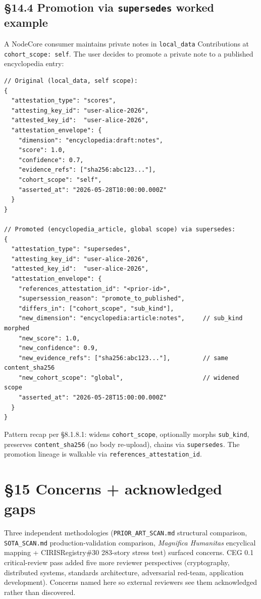 \documentclass[10pt]{article}
\begin{document}
\subsection*{§14.4 Promotion via \texttt{supersedes} worked example}


A NodeCore consumer maintains private notes in \texttt{local\_data} Contributions at \texttt{cohort\_scope: self}. The user decides to promote a private note to a published encyclopedia entry:


\begin{lstlisting}
// Original (local_data, self scope):
{
  "attestation_type": "scores",
  "attesting_key_id": "user-alice-2026",
  "attested_key_id":  "user-alice-2026",
  "attestation_envelope": {
    "dimension": "encyclopedia:draft:notes",
    "score": 1.0,
    "confidence": 0.7,
    "evidence_refs": ["sha256:abc123..."],
    "cohort_scope": "self",
    "asserted_at": "2026-05-28T10:00:00.000Z"
  }
}

// Promoted (encyclopedia_article, global scope) via supersedes:
{
  "attestation_type": "supersedes",
  "attesting_key_id": "user-alice-2026",
  "attested_key_id":  "user-alice-2026",
  "attestation_envelope": {
    "references_attestation_id": "<prior-id>",
    "supersession_reason": "promote_to_published",
    "differs_in": ["cohort_scope", "sub_kind"],
    "new_dimension": "encyclopedia:article:notes",     // sub_kind morphed
    "new_score": 1.0,
    "new_confidence": 0.9,
    "new_evidence_refs": ["sha256:abc123..."],         // same content_sha256
    "new_cohort_scope": "global",                      // widened scope
    "asserted_at": "2026-05-28T15:00:00.000Z"
  }
}
\end{lstlisting}

Pattern recap per §8.1.8.1: widens \texttt{cohort\_scope}, optionally morphs \texttt{sub\_kind}, preserves \texttt{content\_sha256} (no body re-upload), chains via \texttt{supersedes}. The promotion lineage is walkable via \texttt{references\_attestation\_id}.




\clearpage


\section*{§15 Concerns + acknowledged gaps}


Three independent methodologies (\texttt{PRIOR\_ART\_SCAN.md} structural comparison, \texttt{SOTA\_SCAN.md} production-validation comparison, \textit{Magnifica Humanitas} encyclical mapping + CIRISRegistry\#30 283-story stress test) surfaced concerns. CEG 0.1 critical-review pass added five more reviewer perspectives (cryptography, distributed systems, standards architecture, adversarial red-team, application development). Concerns named here so external reviewers see them acknowledged rather than discovered.
\end{document}
